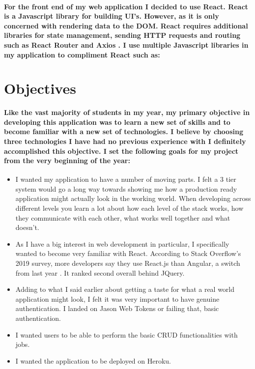 \paragraph{For the front end of my web application I decided to use React. React is a Javascript library for building UI's. However, as it is only concerned with rendering data to the DOM. React requires  additional libraries for state management, sending HTTP requests and routing such as React Router and Axios \cite{wiki:xxx}. I use multiple Javascript libraries in my application to compliment React such as: } 

\section{Objectives}
\paragraph{Like the vast majority of students in my year, my primary objective in developing this application was to learn a new set of skills and to become familiar with a new set of technologies. I believe by choosing three technologies I have had no previous experience with I definitely accomplished this objective. I set the following goals for my project from the very beginning of the year:}
\begin{itemize}
    \item I wanted my application to have a number of moving parts. I felt a 3 tier system would go a long way towards showing me how a production ready application might actually look in the working world. When developing across different levels you learn a lot about how each level of the stack works, how they communicate with each other, what works well together and what doesn't.
    \item As I have a big interest in web development in particular, I specifically wanted to become very familiar with React. According to Stack Overflow's 2019 survey, more developers say they use React.js than Angular, a switch from last year \cite{Stack}. It ranked second overall behind JQuery.
    \item Adding to what I said earlier about getting a taste for what a real world application might look, I felt it was very important to have genuine authentication. I landed on Jason Web Tokens or failing that, basic authentication.
    \item I wanted users to be able to perform the basic CRUD functionalities with jobs.
    \item I wanted the application to be deployed on Heroku.

\end{itemize}

